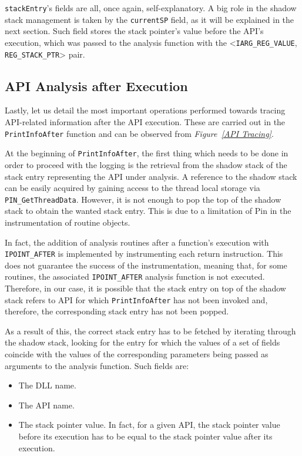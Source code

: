 \texttt{stackEntry}'s fields are all, once again, self-explanatory. A big role in the shadow stack management is taken by the \texttt{currentSP} field, as it will be explained in the next section. Such field stores the stack pointer's value before the API's execution, which was passed to the analysis function with the <\texttt{IARG\_REG\_VALUE}, \texttt{REG\_STACK\_PTR}> pair.

\subsection{API Analysis after Execution}

Lastly, let us detail the most important operations performed towards tracing API-related information after the API execution. These are carried out in the \texttt{PrintInfoAfter} function and can be observed from \textit{Figure~\ref{API Tracing}}.

At the beginning of \texttt{PrintInfoAfter}, the first thing which needs to be done in order to proceed with the logging is the retrieval from the shadow stack of the stack entry representing the API under analysis. A reference to the shadow stack can be easily acquired by gaining access to the thread local storage via \texttt{PIN\_GetThreadData}. However, it is not enough to pop the top of the shadow stack to obtain the wanted stack entry. This is due to a limitation of Pin in the instrumentation of routine objects.

In fact, the addition of analysis routines after a function's execution with \texttt{IPOINT\_AFTER} is implemented by instrumenting each return instruction. This does not guarantee the success of the instrumentation, meaning that, for some routines, the associated \texttt{IPOINT\_AFTER} analysis function is not executed. Therefore, in our case, it is possible that the stack entry on top of the shadow stack refers to API for which \texttt{PrintInfoAfter} has not been invoked and, therefore, the corresponding stack entry has not been popped.

As a result of this, the correct stack entry has to be fetched by iterating through the shadow stack, looking for the entry for which the values of a set of fields coincide with the values of the corresponding parameters being passed as arguments to the analysis function. Such fields are:
\begin{itemize}
\item The DLL name.
\item The API name.
\item The stack pointer value. In fact, for a given API, the stack pointer value before its execution has to be equal to the stack pointer value after its execution.
\end{itemize} 

